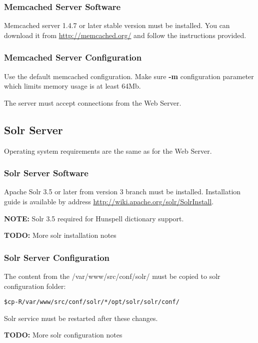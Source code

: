 \documentclass[12pt]{article}
\newcommand{\vigShowNotes}{1}
\newcommand{\vigPathToProject}{/var/www}
\newcommand{\vigPathToSrc}{/src}
\newcommand{\note}[1]{
\textbf{NOTE:} 
#1
}
\newcommand{\todo}[1]{
\textbf{TODO:} 
#1
}
\begin{document}
\subsubsection{Memcached Server Software}

Memcached server 1.4.7 or later stable version must be installed. You can download it from \url{http://memcached.org/} and follow the instructions provided.

\subsubsection{Memcached Server Configuration}

Use the default memcached configuration. Make sure \textbf{-m} configuration parameter which limits memory usage is at least 64Mb.

The server must accept connections from the Web Server.

\subsection{Solr Server}
Operating system requirements are the same as for the Web Server.

\subsubsection{Solr Server Software}

Apache Solr 3.5 or later from version 3 branch must be installed. Installation guide is available by address \url{http://wiki.apache.org/solr/SolrInstall}.

\note{Solr 3.5 required for Hunspell dictionary support.}

\todo{More solr installation notes}

\subsubsection{Solr Server Configuration}

The content from the \textsf{\vigPathToProject\vigPathToSrc/conf/solr/} must be copied to solr configuration folder:

\begin{alltt}
\$ cp -R \vigPathToProject\vigPathToSrc/conf/solr/* /opt/solr/solr/conf/
\end{alltt}

Solr service must be restarted after these changes.

\todo{More solr configuration notes}
\end{document}
